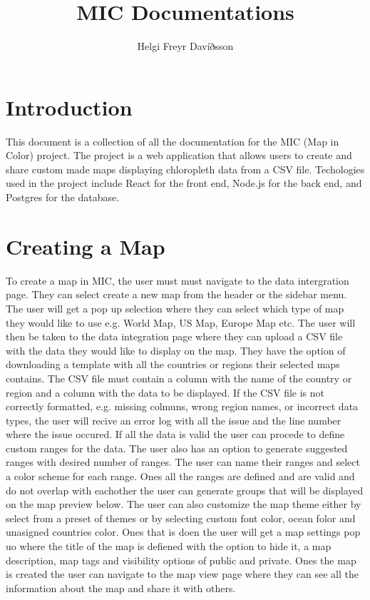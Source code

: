 \documentclass{article}
\date{\icelandicdate} %
\title{MIC Documentations}
\author{Helgi Freyr Davíðsson}
\date{\icelandicdate} %
\begin{document}
\maketitle

\section{Introduction}

This document is a collection of all the documentation for the MIC (Map in Color) project. The project is a web application that allows users to create and share custom made maps displaying chloropleth data from a CSV file. Techologies used in the project include React for the front end, Node.js for the back end, and Postgres for the database. 

\section{Creating a Map}
To create a map in MIC, the user must must navigate to the data intergration page. They can select create a new map from the header or the sidebar menu. The user will get a pop up selection where they can select which type of map they would like to use e.g. World Map, US Map, Europe Map etc. The user will then be taken to the data integration page where they can upload a CSV file with the data they would like to display on the map. They have the option of downloading a template with all the countries or regions their selected maps contains. The CSV file must contain a column with the name of the country or region and a column with the data to be displayed. If the CSV file is not correctly formatted, e.g. missing colmuns, wrong region names, or incorrect data types, the user will recive an error log with all the issue and the line number where the issue occured. If all the data is valid the user can procede to define custom ranges for the data. The user also has an option to generate suggested ranges with desired number of ranges. The user can name their ranges and select a color scheme for each range. Ones all the ranges are defined and are valid and do not overlap with eachother the user can generate groups that will be displayed on the map preview below. The user can also customize the map theme either by select from a preset of themes or by selecting custom font color, ocean folor and unasigned countries color. Ones that is doen the user will get a map settings pop uo where the title of the map is defiened with the option to hide it, a map description, map tags and visibility options of public and private. Ones the map is created the user can navigate to the map view page where they can see all the information about the map and share it with others.
\end{document}
